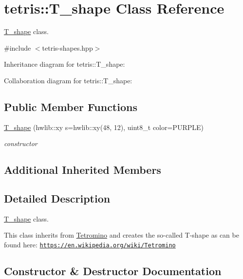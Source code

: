 \hypertarget{classtetris_1_1T__shape}{}\section{tetris\+:\+:T\+\_\+shape Class Reference}
\label{classtetris_1_1T__shape}


\hyperlink{classtetris_1_1T__shape}{T\+\_\+shape} class.  




{\ttfamily \#include $<$tetris-\/shapes.\+hpp$>$}



Inheritance diagram for tetris\+:\+:T\+\_\+shape\+:


Collaboration diagram for tetris\+:\+:T\+\_\+shape\+:
\subsection*{Public Member Functions}
\begin{DoxyCompactItemize}
\item 
\hyperlink{classtetris_1_1T__shape_a4edd6b6cb73013098157ee457e758bd9}{T\+\_\+shape} (hwlib\+::xy s=hwlib\+::xy(48, 12), uint8\+\_\+t color=P\+U\+R\+P\+LE)
\begin{DoxyCompactList}\small\item\em constructor \end{DoxyCompactList}\end{DoxyCompactItemize}
\subsection*{Additional Inherited Members}


\subsection{Detailed Description}
\hyperlink{classtetris_1_1T__shape}{T\+\_\+shape} class. 

This class inherits from \hyperlink{classtetris_1_1Tetromino}{Tetromino} and creates the so-\/called T-\/shape as can be found here\+: \href{https://en.wikipedia.org/wiki/Tetromino}{\tt https\+://en.\+wikipedia.\+org/wiki/\+Tetromino} 

\subsection{Constructor \& Destructor Documentation}
\mbox{\label{classtetris_1_1T__shape_a4edd6b6cb73013098157ee457e758bd9}} 
